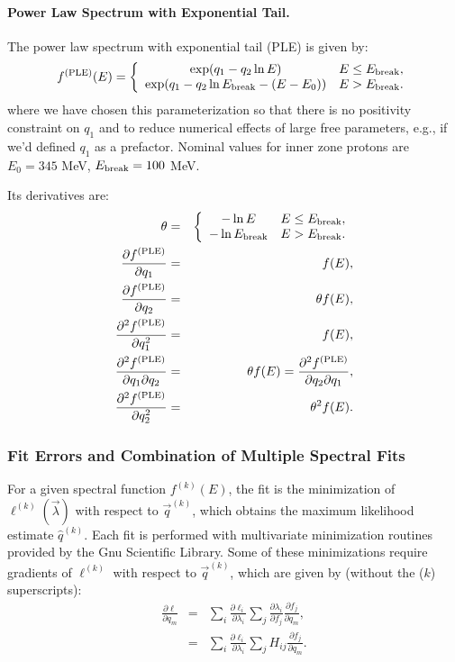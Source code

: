 \documentclass{article}    %
\newcommand{\subsubsubsection}[1]{\paragraph{#1.}}
\begin{document}
\subsubsubsection{Power Law Spectrum with Exponential Tail}

The power law spectrum with exponential tail (PLE) is given by:
\begin{equation}
f^{\rm (PLE)}(E) = \left\{\begin{array}{cl}
\exp(q_1 - q_2\ln E) & E \le E_{\rm break}, \\
\exp(q_1 - q_2\ln E_{\rm break} - (E-E_0)) & E > E_{\rm break}.
\end{array}
\right.
\end{equation}
where we have chosen this parameterization so that there is no
positivity constraint on $q_1$ and to reduce numerical effects of
large free parameters, e.g., if we'd defined $q_1$ as a prefactor.
Nominal values for inner zone protons are $E_0 = 345$ MeV, $E_{\rm
  break} = 100$ MeV.

Its derivatives are:
\begin{eqnarray}
\theta &=& \left\{\begin{array}{cl}
-\ln E & E \le E_{\rm break}, \\
-\ln E_{\rm break} & E > E_{\rm break}.
\end{array}
\right. \\
\frac{\partial f^{\rm (PLE)}}{\partial q_1} &=& f(E), \\
\frac{\partial f^{\rm (PLE)}}{\partial q_2} &=& \theta f(E), \\
\frac{\partial^2 f^{\rm (PLE)}}{\partial q_1^2} &=& f(E), \\
\frac{\partial^2 f^{\rm (PLE)}}{\partial q_1\partial q_2} &=& \theta f(E) 
= \frac{\partial^2 f^{\rm (PLE)}}{\partial q_2\partial q_1}, \\
\frac{\partial^2 f^{\rm (PLE)}}{\partial q_2^2} &=& \theta^2 f(E).
\end{eqnarray}

\subsubsection{Fit Errors and Combination of Multiple Spectral Fits}

For a given spectral function $f^{(k)}(E)$, the fit is the
minimization of $\ell^{(k)}(\vec{\lambda})$ with respect to
$\vec{q}^{(k)}$, which obtains the maximum likelihood estimate
$\hat{q}^{(k)}$. Each fit is performed with multivariate minimization
routines provided by the Gnu Scientific Library. Some of these
minimizations require gradients of $\ell^{(k)}$ with respect to
$\vec{q}^{(k)}$, which are given by (without the ($k$) superscripts):
\begin{eqnarray}
\frac{\partial \ell}{\partial q_m} &=&
\sum_i \frac{\partial \ell_i}{\partial \lambda_i} \sum_j \frac{\partial\lambda_i }{\partial f_j} \frac{\partial f_j}{\partial q_m}, \nonumber \\
&=&
\sum_i \frac{\partial \ell_i}{\partial \lambda_i} \sum_j H_{ij} \frac{\partial f_j}{\partial q_m}.
\end{eqnarray}
\end{document}
